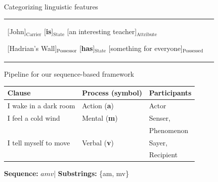 \documentclass[handout,10pt]{beamer}
\begin{document}
\begin{frame}{Categorizing linguistic features}
\begin{table}[!htb]
{\begin{tabular}{p{4cm}|p{11cm}}
        [John]$_{\text{Carrier}}$ [\textbf{is}]$_{\text{State}}$ [an interesting teacher]$_{\text{Attribute}}$ \newline
        
        [Hadrian's Wall]$_{\text{Possessor}}$ [\textbf{has}]$_{\text{State}}$ [something for everyone]$_{\text{Possessed}}$ \\ %
    \end{tabular}}
    \label{tab:process_participants}
\end{table}
    
\end{frame}

\begin{frame}{Pipeline for our sequence-based framework}


\begin{table}[!ht]
  \centering
  \small
  \renewcommand{\arraystretch}{1.1}
  \begin{threeparttable}
    \label{tab:example}
    \begin{tabular}{lll}
      \textbf{Clause} & \textbf{Process (symbol)} & \textbf{Participants} \\
      \midrule
      I wake in a dark room         & Action (\textbf{a})  & Actor \\
      I feel a cold wind            & Mental (\textbf{m})  & Senser,\\
                                            &             & Phenomenon \\
      I tell myself to move         & Verbal (\textbf{v})  & Sayer,\\
                                            &             & Recipient \\
      \bottomrule
    \end{tabular}

    \begin{tablenotes}[flushleft]
      \footnotesize
      \item \textbf{Sequence:} $amv$\quad|\quad
            \textbf{Substrings:} \{am, mv\}
    \end{tablenotes}
  \end{threeparttable}
\end{table}


\end{frame}
\end{document}
